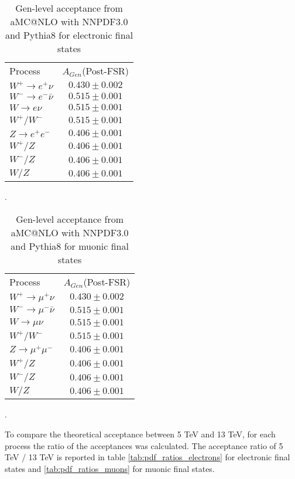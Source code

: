 \documentclass[aps,prd,final,twocolumn,letterpaper]{revtex4}
\begin{document}
			\begin{table}
				\centering
				\begin{tabular}{l  c}
					Process 							& $A_{Gen}$(Post-FSR) 		\\
					$W^{+}\rightarrow e^{+}\nu$ 		& $0.430 \pm 0.002$ 		\\
					$W^{-}\rightarrow e^{-}\bar{\nu}$ 	& $0.515\pm 0.001$ 			\\		
					$W\rightarrow e\nu$ 				& $0.515\pm 0.001$ 			\\
					$W^{+}/W^{-}$					 	& $0.515\pm 0.001$ 			\\
					$Z\rightarrow e^{+}e^{-}$ 			& $0.406\pm 0.001$ 			\\
					$W^{+}/Z$				 			& $0.406\pm 0.001$ 			\\
					$W^{-}/Z$				 			& $0.406\pm 0.001$ 			\\
					$W/Z$				 				& $0.406\pm 0.001$ 			\\					
				\end{tabular}
				\caption{Gen-level acceptance from aMC@NLO with NNPDF3.0 and Pythia8 for electronic final states}.
				\label{tab:gen_acceptance_electrons}
			\end{table}

			\begin{table}
				\centering
				\begin{tabular}{l  c}
					Process 								& $A_{Gen}$(Post-FSR) 		\\
					$W^{+}\rightarrow \mu^{+}\nu$ 			& $0.430 \pm 0.002$ 		\\
					$W^{-}\rightarrow \mu^{-}\bar{\nu}$ 	& $0.515\pm 0.001$ 			\\		
					$W\rightarrow \mu\nu$ 					& $0.515\pm 0.001$ 			\\
					$W^{+}/W^{-}$					 		& $0.515\pm 0.001$ 			\\
					$Z\rightarrow \mu^{+}\mu^{-}$ 			& $0.406\pm 0.001$ 			\\
					$W^{+}/Z$				 				& $0.406\pm 0.001$ 			\\
					$W^{-}/Z$				 				& $0.406\pm 0.001$ 			\\
					$W/Z$				 					& $0.406\pm 0.001$ 			\\					
				\end{tabular}
				\caption{Gen-level acceptance from aMC@NLO with NNPDF3.0 and Pythia8 for muonic final states}.
				\label{tab:gen_acceptance_muons}
			\end{table}
			
			To compare the theoretical acceptance between 5 TeV and 13 TeV, for each process the ratio of the acceptances was calculated. The acceptance ratio of 5 TeV / 13 TeV is reported in table \ref{tab:pdf_ratios_electrons} for electronic final states and \ref{tab:pdf_ratios_muons} for muonic final states.
			
\end{document}
